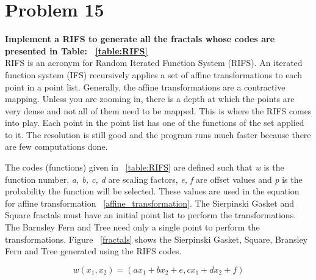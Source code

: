 \section{Problem 15}
\textbf{ Implement a RIFS to generate all the fractals whose codes are presented in Table: ~\ref{table:RIFS} } \\
\newline
RIFS is an acronym for Random Iterated Function System (RIFS). An iterated function system (IFS) recursively applies a set of affine transformations to each point in a point list. Generally, the affine transformations are a contractive mapping.  Unless you are zooming in, there is a depth at which the points are very dense and not all of them need to be mapped. This is where the RIFS comes into play. Each point in the point list has one of the functions of the set applied to it. The resolution is still good and the program runs much faster because there are few computations done. 

The codes (functions) given in ~\ref{table:RIFS} are defined such that \textit{w} is the function number, \textit{a, b, c, d} are scaling factors, \textit{e, f} are offset values and \textit{p} is the probability the function will be selected. These values are used in the equation for affine transformation ~\ref{affine_transformation}. The Sierpinski Gasket and Square fractals must have an initial point list to perform the transformations. The Barnsley Fern and Tree need only a single point to perform the transformations. Figure ~\ref{fractals} shows the Sierpinski Gasket, Square, Bransley Fern and Tree generated using the RIFS codes. 

\begin{equation}
w(x_1 , x_2) = ( a x_1 + b x_2 + e, c x_1 + d x_2 + f )
\end{equation} \label{affine_transformation}

